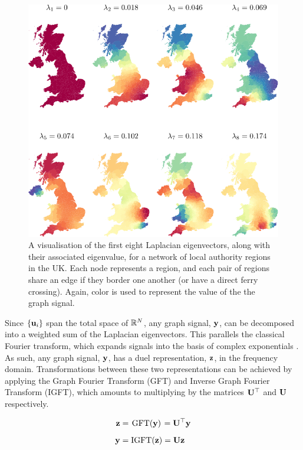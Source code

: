 \begin{figure}[t]
	\centering
		\includegraphics[width=0.85\linewidth]{Figures/uk_plot.pdf}
        \caption[A visualisation of the Laplacian eigenvectors for a network of regions in the UK]{A visualisation of the first eight Laplacian eigenvectors, along with their associated eigenvalue, for a network of local authority regions in the UK. Each node represents a region, and each pair of regions share an edge if they border one another (or have a direct ferry crossing). Again, color is used to represent the value of the the graph signal. }
	\label{fig:uk_eigs}
\end{figure}


Since $\{\mathbf{u}_i\}$ span the total space of $\mathbb{R}^N$, any graph signal, $\mathbf{y}$, can be decomposed into a weighted sum of the Laplacian eigenvectors. This parallels the classical Fourier transform, which expands signals into the basis of complex exponentials \citep{Sneddon1995}. As such, any graph signal, $\mathbf{y}$, has a duel representation, $\mathbf{z}$, in the frequency domain. Transformations between these two representations can be achieved by applying the Graph Fourier Transform (GFT) and Inverse Graph Fourier Transform (IGFT), which amounts to multiplying by the matrices $\mathbf{U}^\top$ and $\mathbf{U}$ respectively. 

\begin{align}
    \mathbf{z} &= \mkern 2mu \text{GFT}(\mathbf{y}) \mkern 2mu = \mathbf{U}^\top \mathbf{y} \\[0.2cm]
    \mathbf{y} &= \text{IGFT}(\mathbf{z})  = \mathbf{U} \mathbf{z}
\end{align}

